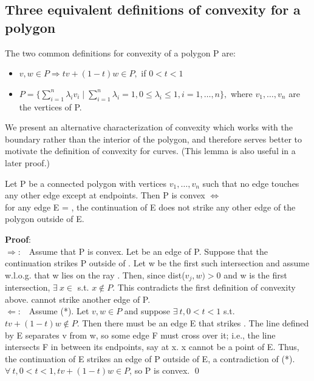 \subsection{Three equivalent definitions of convexity for a polygon}
The two common definitions for convexity of a polygon P are:
\begin{itemize}
  \item $v,w \in P \Rightarrow tv + (1-t)w \in P,$ if $0<t<1$
  \item $P = \{ \sum_{i=1}^{n} \lambda _{i}v_{i} \mid 
     \sum_{i=1}^{n} \lambda _{i} = 1, 0 \leq \lambda _{i} \leq 1,
     i = 1, \ldots ,n \},$ where $v_{1}, \ldots ,v_{n}$ are the 
     vertices of P.
\end{itemize}
We present an alternative characterization of convexity which works
with the boundary rather than the interior of the polygon, and therefore
serves better to motivate the definition of convexity for curves.
(This lemma is also useful in a later proof.)
\begin{lemma}\nopagebreak 
\label{conv3}
Let P be a connected polygon with vertices $v_{1}, \ldots ,v_{n}$ such that
no edge touches any other edge except at endpoints.
Then P is convex $\Leftrightarrow$
\\
for any edge E = 
\marginpar{(*)}
, the continuation 
of E does not strike any other edge of the polygon outside of E.
\end{lemma}
{\bf Proof}:\nopagebreak\\
$\Rightarrow$:\ \ Assume that P is convex.  Let 
be an edge of P.  Suppose that the continuation 
strikes P outside of .  Let w be the first such intersection
and assume w.l.o.g. that w lies on the ray .
Then, since dist($v_{j},w) > 0$ and w is the first intersection,
$\exists\ x \in$  s.t. $x \not\in P.$
This contradicts the first definition of convexity above.
\hence {} cannot strike another edge of P.\vspace{.25in} \\
$\Leftarrow$:\ \ Assume (*).  Let $v,w \in P$ and suppose 
$\exists\ t, 0<t<1$ s.t. $tv + (1-t)w \not\in P.$
Then there must be an edge E that strikes .
The line defined by E separates v from w,
 so some edge F must cross over it; i.e., the line intersects F
in between its endpoints, say at x.
x cannot be a point of E.
Thus, the continuation of E strikes an edge of P outside of E, a 
contradiction of (*).
\hence $\forall\ t, 0<t<1 , tv + (1-t)w \in P$, so P is convex.
\qed
